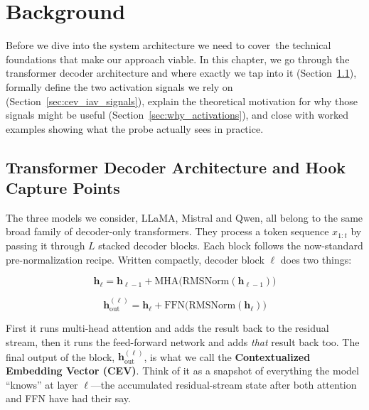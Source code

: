 \chapter{Background}
\label{ch:background}

Before we dive into the system architecture we need to cover the technical foundations that make our approach viable. In this chapter, we go through the transformer decoder architecture and where exactly we tap into it (Section~\ref{sec:decoder_arch}), formally define the two activation signals we rely on (Section~\ref{sec:cev_iav_signals}), explain the theoretical motivation for why those signals might be useful (Section~\ref{sec:why_activations}), and close with worked examples showing what the probe actually sees in practice.

\section{Transformer Decoder Architecture and Hook Capture Points}
\label{sec:decoder_arch}

The three models we consider, LLaMA, Mistral and Qwen, all belong to the same broad family of decoder-only transformers. They process a token sequence $x_{1:t}$ by passing it through $L$ stacked decoder blocks. Each block follows the now-standard pre-normalization recipe. Written compactly, decoder block $\ell$ does two things:

\begin{equation}
    \mathbf{h}_\ell = \mathbf{h}_{\ell-1} + \text{MHA}\bigl(\text{RMSNorm}(\mathbf{h}_{\ell-1})\bigr)
    \label{eq:mha}
\end{equation}

\begin{equation}
    \mathbf{h}_{\text{out}}^{(\ell)} = \mathbf{h}_\ell + \text{FFN}\bigl(\text{RMSNorm}(\mathbf{h}_\ell)\bigr)
    \label{eq:ffn_residual}
\end{equation}

\noindent First it runs multi-head attention and adds the result back to the residual stream, then it runs the feed-forward network and adds \emph{that} result back too. The final output of the block, $\mathbf{h}_{\text{out}}^{(\ell)}$, is what we call the \textbf{Contextualized Embedding Vector (CEV)}. Think of it as a snapshot of everything the model ``knows'' at layer $\ell$—the accumulated residual-stream state after both attention and FFN have had their say.

